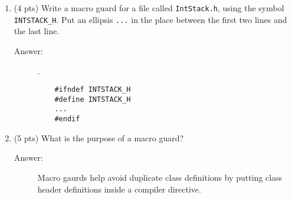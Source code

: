 \documentclass[11pt]{article}
\begin{document}
\begin{enumerate}
\item (4 pts) Write a macro guard for a file called \texttt{IntStack.h},
using the symbol \texttt{INTSTACK\_H}. Put an ellipsis \texttt{...} in the
place between the first two lines and the last line.

\begin{description}
  \item[Answer:] .\\
  \begin{verbatim}
    #ifndef INTSTACK_H
    #define INTSTACK_H
    ...
    #endif
  \end{verbatim}
\end{description}

\vspace{6em}
\item (5 pts) What is the purpose of a macro guard?

\begin{description}
  \item[Answer:] Macro gaurds help avoid duplicate class definitions by putting class header definitions inside a compiler directive.
\end{description}

\end{enumerate}
\end{document}

